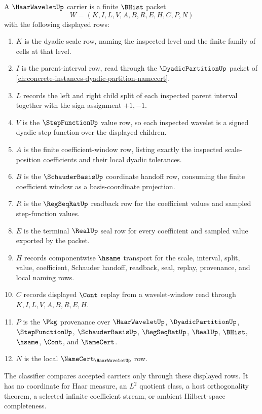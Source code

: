 \begin{definition}
\label{def:haar-wavelet-carrier}
A $\HaarWaveletUp$ carrier is a finite $\BHist$ packet
$$
W=(K,I,L,V,A,B,R,E,H,C,P,N)
$$
with the following displayed rows:
\begin{enumerate}
\item $K$ is the dyadic scale row, naming the inspected level and the finite family of cells at that level.
\item $I$ is the parent-interval row, read through the $\DyadicPartitionUp$ packet of \autoref{ch:concrete-instances-dyadic-partition-namecert}.
\item $L$ records the left and right child split of each inspected parent interval together with the sign assignment $+1,-1$.
\item $V$ is the $\StepFunctionUp$ value row, so each inspected wavelet is a signed dyadic step function over the displayed children.
\item $A$ is the finite coefficient-window row, listing exactly the inspected scale-position coefficients and their local dyadic tolerances.
\item $B$ is the $\SchauderBasisUp$ coordinate handoff row, consuming the finite coefficient window as a basis-coordinate projection.
\item $R$ is the $\RegSeqRatUp$ readback row for the coefficient values and sampled step-function values.
\item $E$ is the terminal $\RealUp$ seal row for every coefficient and sampled value exported by the packet.
\item $H$ records componentwise $\hsame$ transport for the scale, interval, split, value, coefficient, Schauder handoff, readback, seal, replay, provenance, and local naming rows.
\item $C$ records displayed $\Cont$ replay from a wavelet-window read through $K,I,L,V,A,B,R,E,H$.
\item $P$ is the $\Pkg$ provenance over $\HaarWaveletUp$, $\DyadicPartitionUp$, $\StepFunctionUp$, $\SchauderBasisUp$, $\RegSeqRatUp$, $\RealUp$, $\BHist$, $\hsame$, $\Cont$, and $\NameCert$.
\item $N$ is the local $\NameCert_{\HaarWaveletUp}$ row.
\end{enumerate}
The classifier compares accepted carriers only through these displayed rows. It has no coordinate for Haar measure, an $L^2$ quotient class, a host orthogonality theorem, a selected infinite coefficient stream, or ambient Hilbert-space completeness.
\end{definition}

